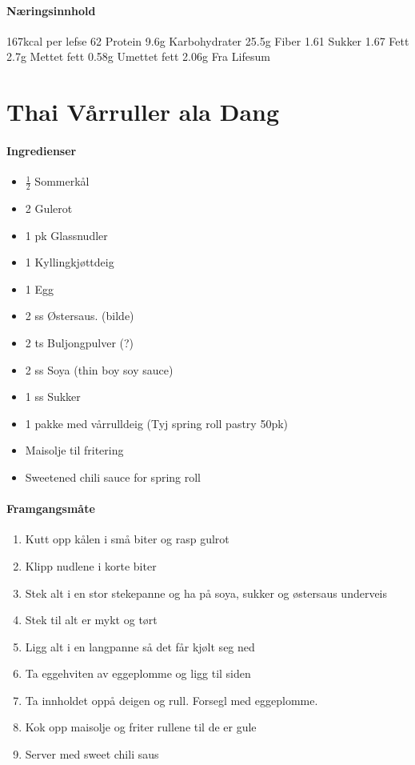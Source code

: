 \documentclass[12pt,a4paper]{book}
\begin{document}
\paragraph{Næringsinnhold}
167kcal per lefse
62
Protein 9.6g
Karbohydrater 25.5g
	Fiber 1.61
	Sukker 1.67
Fett 2.7g
	Mettet fett 0.58g
	Umettet fett 2.06g
Fra Lifesum
\clearpage{}
\clearpage{}\section{﻿Thai Vårruller ala Dang}


\paragraph{Ingredienser}
\begin{itemize}[noitemsep]
	\item  $\frac{1}{2}$  Sommerkål
	\item 2 Gulerot
	\item 1 pk Glassnudler
	\item 1 Kyllingkjøttdeig
	\item 1 Egg
	\item 2 ss Østersaus. (bilde)
	\item 2 ts Buljongpulver (?)
	\item 2 ss Soya (thin boy soy sauce)
	\item 1 ss Sukker
	\item 1 pakke med vårrulldeig (Tyj spring roll pastry 50pk)
	\item Maisolje til fritering
	\item Sweetened chili sauce for spring roll
\end{itemize}

\paragraph{Framgangsmåte}
\begin{enumerate}[noitemsep]
	\item Kutt opp kålen i små biter og rasp gulrot
	\item Klipp nudlene i korte biter
	\item Stek alt i en stor stekepanne og ha  på soya, sukker og østersaus underveis
	\item Stek til alt er mykt og tørt
	\item Ligg alt i en langpanne så det får kjølt seg ned
	\item Ta eggehviten av eggeplomme og ligg til siden
	\item Ta innholdet oppå deigen og rull.  Forsegl med eggeplomme.
	\item Kok opp maisolje og friter rullene til de er gule
	\item Server med sweet chili saus
\end{enumerate}
\end{document}
